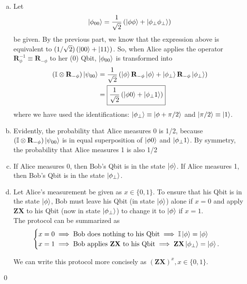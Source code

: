 \documentclass{book}
\theoremstyle{definition}
\newcommand{\nn}{\nonumber}
\newcommand{\X}{\mathbf{X}}
\newcommand{\f}[2]{\frac{#1}{#2}}
\newcommand{\lp}{\left(}
\newcommand{\rp}{\right)}
\newcommand{\Id}{\mathbb{I}}
\newcommand{\Z}{\mathbf{Z}}
\begin{document}
\begin{enumerate}[(a)]
	\item Let 
	\begin{align}
	\ket{\phi_{00}} = \f{1}{\sqrt{2}}\lp \ket{\phi\phi}  + \ket{\phi_\perp\phi_\perp}\rp
	\end{align}
	be given. By the previous part, we know that the expression above is equivalent to $(1/\sqrt{2})\lp \ket{00} + \ket{11} \rp$. So, when Alice applies the operator $\mathbf{R}_{\phi}^{-1} \equiv \mathbf{R}_{-\phi}$ to her (0) Qbit, $\ket{\phi_{00}}$ is transformed into
	\begin{align}
	(\Id \otimes \mathbf{R}_{-\phi})\ket{\psi_{00}} &= \f{1}{\sqrt{2}}\lp \ket{\phi}\mathbf{R}_{-\phi}\ket{\phi} + \ket{\phi_\perp}\mathbf{R}_{-\phi}\ket{\phi_\perp} \rp\nn\\
	&= \boxed{\f{1}{\sqrt{2}}\lp \ket{\phi 0} + \ket{\phi_\perp 1} \rp}
	\end{align}
	where we have used the identifications: $\ket{\phi_\perp} \equiv\ket{\phi + \pi/2}$ and $\ket{\pi/2} \equiv \ket{1}$. 
	
	
	\item Evidently, the probability that Alice measures 0 is 1/2, because $(\Id \otimes \mathbf{R}_{-\phi})\ket{\psi_{00}}$ is in equal superposition of $\ket{\phi 0}$ and $\ket{\phi_\perp 1}$. By symmetry, the probability that Alice measures 1 is also 1/2 
	
	\item  If Alice measures 0, then Bob's Qbit is in the state $\ket{\phi}$. If Alice measures 1, then Bob's Qbit is in the state $\ket{\phi_\perp}$.
	
	
	\item Let Alice's measurement be given as $x \in \{0,1\}$. To ensure that his Qbit is in the state $\ket{\phi}$, Bob must leave his Qbit (in state $\ket{\phi}$) alone if $x=0$ and apply $\Z\X$ to his Qbit (now in state $\ket{\phi_\perp}$) to change it to $\ket{\phi}$ if $x = 1$. \\
	
	The protocol can be summarized as
	\begin{align}
	\begin{cases}
	x = 0 \implies \text{Bob does nothing to his Qbit} \implies \Id\ket{\phi} = \ket{\phi}\\
	x = 1 \implies \text{Bob applies $\Z\X$ to his Qbit} \implies \Z \X \ket{\phi_\perp} = \ket{\phi}.
	\end{cases}
	\end{align}
	
	We can write this protocol more concisely as $\boxed{\lp \Z \X \rp^x, x \in \{0,1\}}$. 
	

	
	
	
\end{enumerate}\qed
\end{document}
